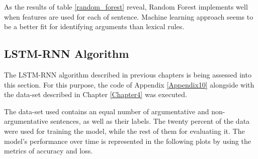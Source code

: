 As the results of table \ref{random_forest} reveal, Random Forest implements well when features are used for each of sentence. Machine learning approach seems to be a better fit for identifying arguments than lexical rules.

\subsection{LSTM-RNN Algorithm}

The LSTM-RNN algorithm described in previous chapters is being assessed into this section. For this purpose, the code of Appendix \ref{Appendix10} alongside with the data-set described in Chapter \ref{Chapter4} was executed.

The data-set used contains an equal number of argumentative and non-argumentative sentences, as well as their labels. The twenty percent of the data were used for training the model, while the rest of them for evaluating it. The model's performance over time is represented in the following plots by using the metrics of accuracy and loss. 


